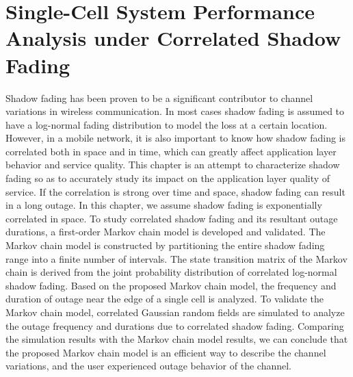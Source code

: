 \chapter{Single-Cell System Performance Analysis under Correlated Shadow Fading}\label{ch:ExpSingleCell}
\par Shadow fading has been proven to be a significant contributor to channel variations in wireless communication. In most cases shadow fading is assumed to have a log-normal fading distribution to model the loss at a certain location. However, in a mobile network, it is also important to know how shadow fading is correlated both in space and in time, which can greatly affect application layer behavior and service quality. This chapter is an attempt to characterize shadow fading so as to accurately study its impact on the application layer quality of service. If the correlation is strong over time and space, shadow fading can result in a long outage. In this chapter, we assume shadow fading is exponentially correlated in space. To study correlated shadow fading and its resultant outage durations, a first-order Markov chain model is developed and validated. The Markov chain model is constructed by partitioning the entire shadow fading range into a finite number of intervals. The state transition matrix of the Markov chain is derived from the joint probability distribution of correlated log-normal shadow fading. Based on the proposed Markov chain model, the frequency and duration of outage near the edge of a single cell is analyzed. To validate the Markov chain model, correlated Gaussian random fields are simulated to analyze the outage frequency and durations due to correlated shadow fading. Comparing the simulation results with the Markov chain model results, we can conclude that the proposed Markov chain model is an efficient way to describe the channel variations, and the user experienced outage behavior of the channel.
